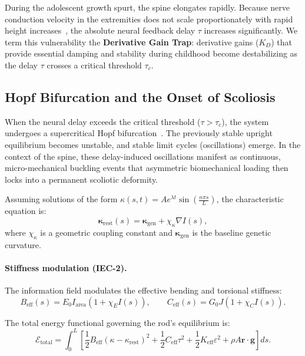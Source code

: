 During the adolescent growth spurt, the spine elongates rapidly. Because nerve conduction velocity in the extremities does not scale proportionately with rapid height increases~\cite{lang1985nerve, robinson2001nerve}, the absolute neural feedback delay $\tau$ increases significantly. We term this vulnerability the \textbf{Derivative Gain Trap}: derivative gains ($K_D$) that provide essential damping and stability during childhood become destabilizing as the delay $\tau$ crosses a critical threshold $\tau_c$.

\subsection{Hopf Bifurcation and the Onset of Scoliosis}

When the neural delay exceeds the critical threshold ($\tau > \tau_c$), the system undergoes a supercritical Hopf bifurcation~\cite{landry2005dynamics}. The previously stable upright equilibrium becomes unstable, and stable limit cycles (oscillations) emerge. In the context of the spine, these delay-induced oscillations manifest as continuous, micro-mechanical buckling events that asymmetric biomechanical loading then locks into a permanent scoliotic deformity.

Assuming solutions of the form $\kappa(s,t) = A e^{\lambda t} \sin\left(\frac{n\pi s}{L}\right)$, the characteristic equation is:
\begin{equation}
\boldsymbol{\kappa}_{\mathrm{rest}}(s) = \boldsymbol{\kappa}_{\mathrm{gen}} + \chi_\kappa \nabla I(s),
\label{eq:kappa_rest_iec_supp}
\end{equation}
where $\chi_\kappa$ is a geometric coupling constant and $\boldsymbol{\kappa}_{\mathrm{gen}}$ is the baseline genetic curvature.

\paragraph{Stiffness modulation (IEC-2).}
The information field modulates the effective bending and torsional stiffness:
\begin{equation}
B_{\mathrm{eff}}(s) = E_0 I_{\mathrm{area}} (1 + \chi_E I(s)), \qquad
C_{\mathrm{eff}}(s) = G_0 J (1 + \chi_C I(s)).
\label{eq:stiffness_modulation_supp}
\end{equation}

The total energy functional governing the rod's equilibrium is:
\begin{equation}
\mathcal{E}_{\mathrm{total}} = \int_0^L \left[ \frac{1}{2} B_{\mathrm{eff}}(\kappa - \kappa_{\mathrm{rest}})^2 + \frac{1}{2} C_{\mathrm{eff}} \tau^2 + \frac{1}{2} K_{\mathrm{eff}} \varepsilon^2 + \rho A \mathbf{r} \cdot \mathbf{g} \right] ds.
\label{eq:iec_energy_supp}
\end{equation}

